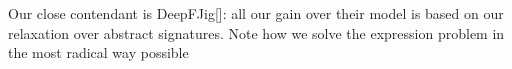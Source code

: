 Our close contendant is DeepFJig[]: all our gain over their model is based on our relaxation over abstract signatures.
Note how we solve the expression problem in the most radical way possible 



